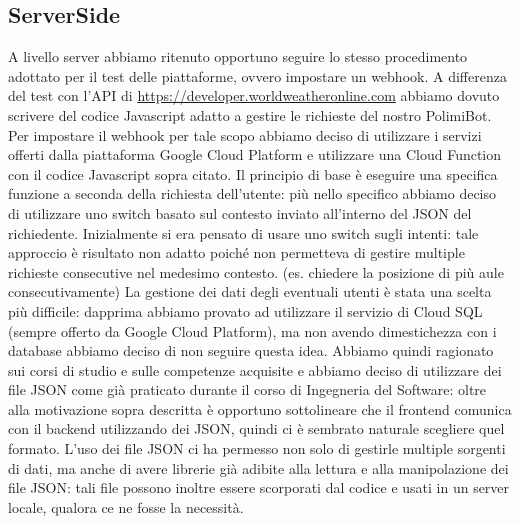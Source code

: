 \documentclass[]{article}
\begin{document}
\subsection{ServerSide}
A livello server abbiamo ritenuto opportuno seguire lo stesso procedimento adottato per il test delle piattaforme, ovvero impostare un webhook. A differenza del test con l’API di  \url{https://developer.worldweatheronline.com} abbiamo dovuto scrivere del codice Javascript adatto a gestire le richieste del nostro PolimiBot. Per impostare il webhook per tale scopo abbiamo deciso di utilizzare i servizi offerti dalla piattaforma Google Cloud Platform e utilizzare una Cloud Function con il codice Javascript sopra citato. 
Il principio di base è eseguire una specifica funzione a seconda della richiesta dell’utente: più nello specifico abbiamo deciso di utilizzare uno switch basato sul contesto inviato all’interno del JSON del richiedente. Inizialmente si era pensato di usare uno switch sugli intenti: tale approccio è risultato non adatto poiché non permetteva di gestire multiple richieste consecutive nel medesimo contesto. (es. chiedere la posizione di più aule consecutivamente) 
La gestione dei dati degli eventuali utenti è stata una scelta più difficile: dapprima abbiamo provato ad utilizzare il servizio di Cloud SQL (sempre offerto da Google Cloud Platform), ma non avendo dimestichezza con i database abbiamo deciso di non seguire questa idea. Abbiamo quindi ragionato sui corsi di studio e sulle competenze acquisite e abbiamo deciso di utilizzare dei file JSON come già praticato durante il corso di Ingegneria del Software: oltre alla motivazione sopra descritta è opportuno sottolineare che il frontend comunica con il backend utilizzando dei JSON, quindi ci è sembrato naturale scegliere quel formato.
L’uso dei file JSON ci ha permesso non solo di gestirle multiple sorgenti di dati, ma anche di avere librerie già adibite alla lettura e alla manipolazione dei file JSON: tali file possono inoltre essere scorporati dal codice e usati in un server locale, qualora ce ne fosse la necessità.
\end{document}
